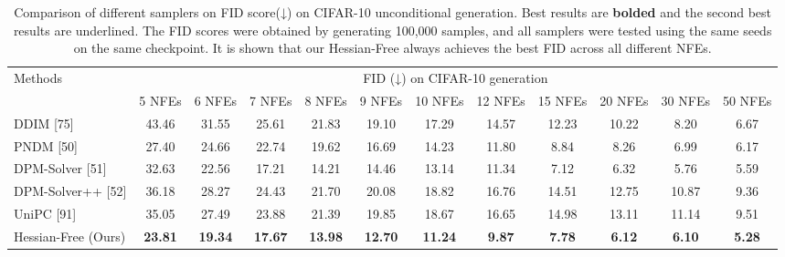 \begin{table}[t]
    \centering
    \footnotesize
    \setlength{\tabcolsep}{2pt}
    \renewcommand{\arraystretch}{0.9}
    \begin{tabular}{l|ccccccccccc}
    \toprule
    \multirow{2}{*}{Methods} & \multicolumn{11}{c}{FID (↓) on CIFAR-10 generation} \\
    \cmidrule(lr){2-12}
    & 5 NFEs & 6 NFEs & 7 NFEs & 8 NFEs & 9 NFEs & 10 NFEs & 12 NFEs & 15 NFEs & 20 NFEs & 30 NFEs & 50 NFEs \\
    \midrule
    DDIM [75] & 43.46 & 31.55 & 25.61 & 21.83 & 19.10 & 17.29 & 14.57 & 12.23 & 10.22 & 8.20 & 6.67 \\
    PNDM [50] & 27.40 & 24.66 & 22.74 & 19.62 & 16.69 & 14.23 & 11.80 & 8.84 & 8.26 & 6.99 & 6.17 \\
    DPM-Solver [51] & 32.63 & 22.56 & 17.21 & 14.21 & 14.46 & 13.14 & 11.34 & 7.12 & 6.32 & 5.76 & 5.59 \\
    DPM-Solver++ [52] & 36.18 & 28.27 & 24.43 & 21.70 & 20.08 & 18.82 & 16.76 & 14.51 & 12.75 & 10.87 & 9.36 \\
    UniPC [91] & 35.05 & 27.49 & 23.88 & 21.39 & 19.85 & 18.67 & 16.65 & 14.98 & 13.11 & 11.14 & 9.51 \\
    \midrule
    Hessian-Free (Ours) & \textbf{23.81} & \textbf{19.34} & \textbf{17.67} & \textbf{13.98} & \textbf{12.70} & \textbf{11.24} & \textbf{9.87} & \textbf{7.78} & \textbf{6.12} & \textbf{6.10} & \textbf{5.28} \\
    \bottomrule
    \end{tabular}
    \caption{Comparison of different samplers on FID score(↓) on CIFAR-10 unconditional generation. Best results are \textbf{bolded} and the second best results are underlined. The FID scores were obtained by generating 100,000 samples, and all samplers were tested using the same seeds on the same checkpoint. It is shown that our Hessian-Free always achieves the best FID across all different NFEs.}
    \label{tab_cifar10_fid_comparison}
\end{table}
